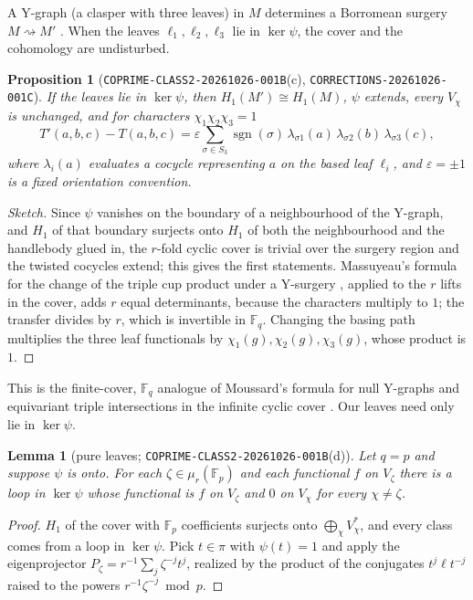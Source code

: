 \documentclass[11pt]{article}
\newtheorem{lemma}[theorem]{Lemma}
\newtheorem{proposition}[theorem]{Proposition}
\theoremstyle{definition}
\theoremstyle{remark}
\newcommand{\F}{\mathbb{F}}
\begin{document}
A Y-graph (a clasper with three leaves) in $M$ determines a Borromean surgery
$M\rightsquigarrow M'$ \cite{Mat87,Hab00}. When the leaves $\ell_1,\ell_2,
\ell_3$ lie in $\ker\psi$, the cover and the cohomology are undisturbed.

\begin{proposition}[\texttt{COPRIME-CLASS2-20261026-001B}(c), \texttt{CORRECTIONS-20261026-001C}]\label{prop:steer}
If the leaves lie in $\ker\psi$, then $H_1(M')\cong H_1(M)$, $\psi$ extends,
every $V_\chi$ is unchanged, and for characters $\chi_1\chi_2\chi_3=1$
\[
T'(a,b,c)-T(a,b,c)=\varepsilon\sum_{\sigma\in S_3}\operatorname{sgn}(\sigma)\,
\lambda_{\sigma1}(a)\,\lambda_{\sigma2}(b)\,\lambda_{\sigma3}(c),
\]
where $\lambda_i(a)$ evaluates a cocycle representing $a$ on the based leaf
$\ell_i$, and $\varepsilon=\pm1$ is a fixed orientation convention.
\end{proposition}

\begin{proof}[Sketch]
Since $\psi$ vanishes on the boundary of a neighbourhood of the Y-graph, and
$H_1$ of that boundary surjects onto $H_1$ of both the neighbourhood and the
handlebody glued in, the $r$-fold cyclic cover is trivial over the surgery
region and the twisted cocycles extend; this gives the first statements.
Massuyeau's formula for the change of the triple cup product under a
Y-surgery \cite[Lemma~3.2]{Mas03}, applied to the $r$ lifts in the cover,
adds $r$ equal determinants, because the characters multiply to $1$; the
transfer divides by $r$, which is invertible in $\F_q$. Changing the basing
path multiplies the three leaf functionals by $\chi_1(g),\chi_2(g),\chi_3(g)$,
whose product is $1$.
\end{proof}

This is the finite-cover, $\F_q$ analogue of Moussard's formula for null
Y-graphs and equivariant triple intersections in the infinite cyclic cover
\cite[Prop.~2.5, Thm.~2.7]{Mou17}. Our leaves need only lie in $\ker\psi$.

\begin{lemma}[pure leaves; \texttt{COPRIME-CLASS2-20261026-001B}(d)]\label{lem:pure}
Let $q=p$ and suppose $\psi$ is onto. For each $\zeta\in\mu_r(\F_p)$ and each
functional $f$ on $V_\zeta$ there is a loop in $\ker\psi$ whose functional is
$f$ on $V_\zeta$ and $0$ on $V_\chi$ for every $\chi\ne\zeta$.
\end{lemma}

\begin{proof}
$H_1$ of the cover with $\F_p$ coefficients surjects onto
$\bigoplus_\chi V_\chi^*$, and every class comes from a loop in $\ker\psi$.
Pick $t\in\pi$ with $\psi(t)=1$ and apply the eigenprojector
$P_\zeta=r^{-1}\sum_j\zeta^{-j}t^j$, realized by the product of the conjugates
$t^j\ell t^{-j}$ raised to the powers $r^{-1}\zeta^{-j}\bmod p$.
\end{proof}
\end{document}
